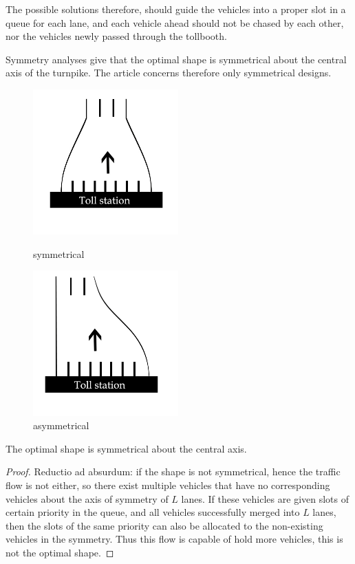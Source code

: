 \documentclass{mcmthesis}
\begin{document}
The possible solutions therefore, should guide the vehicles into a proper slot in a queue for each lane, and each vehicle ahead should not be chased by each other, nor the vehicles newly passed through the tollbooth.

Symmetry analyses give that the optimal shape is symmetrical about the central axis of the turnpike. The article concerns therefore only symmetrical designs.
\begin{figure}[H]
	\begin{minipage}[t]{0.5\linewidth}
		\centering
		\includegraphics[width=2.2in]{symmetrical.jpg}
		\caption{symmetrical}
		\label{symmetrical}
	\end{minipage}%
	\begin{minipage}[t]{0.5\linewidth}
		\centering
		\includegraphics[width=2.2in]{asymmetrical.jpg}
		\caption{asymmetrical}
		\label{asymmetrical}
	\end{minipage}
\end{figure}


\begin{Theorem} \label{thm:yingsongsheng}
The optimal shape is symmetrical about the central axis.
\end{Theorem}
\begin{proof}
Reductio ad absurdum: if the shape is not symmetrical, hence the traffic flow is not either, so there exist multiple vehicles that have no corresponding vehicles about the axis of symmetry of $L$ lanes. If these vehicles are given slots of certain priority in the queue, and all vehicles successfully merged into $L$ lanes, then the slots of the same priority can also be allocated to the non-existing vehicles in the symmetry. Thus this flow is capable of hold more vehicles, this is not the optimal shape.
\end{proof}
\end{document}
